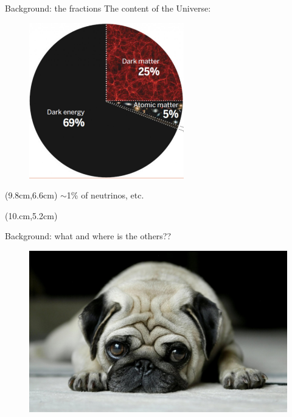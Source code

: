\documentclass[aspectratio=43]{beamer}
\begin{document}
\begin{frame}{Background: the fractions}
The content of the Universe:
  \begin{figure}
    \includegraphics[width=0.6\textwidth]{fraction.jpg}
  \end{figure}
  \begin{textblock*}{3cm}(9.8cm,6.6cm)
    {$\sim$1\% of neutrinos, etc.}
  \end{textblock*}
  \begin{textblock*}{2.6cm}(10.cm,5.2cm)
    {\color{red}{Stars only account for $\sim$0.07\%}}
  \end{textblock*}
\end{frame}

\begin{frame}{Background: what and where is the others??}
  \begin{figure}
    \includegraphics[width=\textwidth]{lonely-dog.jpg}
  \end{figure}
\end{frame}
\end{document}
